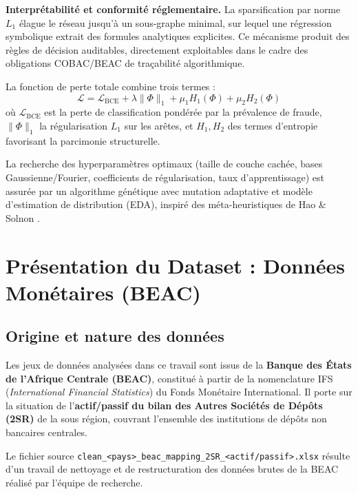 \documentclass[12pt, a4paper]{article}
\begin{document}
\textbf{Interprétabilité et conformité réglementaire.}
La sparsification par norme $L_1$ élague le réseau jusqu'à un sous-graphe
minimal, sur lequel une régression symbolique extrait des formules analytiques
explicites. Ce mécanisme produit des règles de décision auditables,
directement exploitables dans le cadre des obligations COBAC/BEAC de
traçabilité algorithmique.

La fonction de perte totale combine trois termes :
\[
  \mathcal{L} = \mathcal{L}_{\text{BCE}} + \lambda \|\Phi\|_1
              + \mu_1 H_1(\Phi) + \mu_2 H_2(\Phi)
\]
où $\mathcal{L}_{\text{BCE}}$ est la perte de classification pondérée par la
prévalence de fraude, $\|\Phi\|_1$ la régularisation $L_1$ sur les arêtes,
et $H_1, H_2$ des termes d'entropie favorisant la parcimonie structurelle.

La recherche des hyperparamètres optimaux (taille de couche cachée, bases
Gaussienne/Fourier, coefficients de régularisation, taux d'apprentissage)
est assurée par un algorithme génétique avec mutation adaptative et modèle
d'estimation de distribution (EDA), inspiré des méta-heuristiques de Hao
\& Solnon \cite{haosol2024meta}.


\section{Présentation du Dataset : Données Monétaires (BEAC)}
\label{sec:dataset}

\subsection{Origine et nature des données}

Les jeux de données analysées dans ce travail sont issus de la
\textbf{Banque des États de l'Afrique Centrale (BEAC)}, constitué à partir
de la nomenclature IFS (\textit{International Financial Statistics}) du
Fonds Monétaire International. Il porte sur la situation de l'\textbf{actif/passif
du bilan des Autres Sociétés de Dépôts (2SR)} de la sous région, couvrant
l'ensemble des institutions de dépôts non bancaires centrales.

Le fichier source  \texttt{clean\_<pays>\_beac\_mapping\_2SR\_<actif/passif>.xlsx}
 résulte d'un travail de nettoyage et de restructuration des données
brutes de la BEAC réalisé par l'équipe de recherche.
\end{document}
